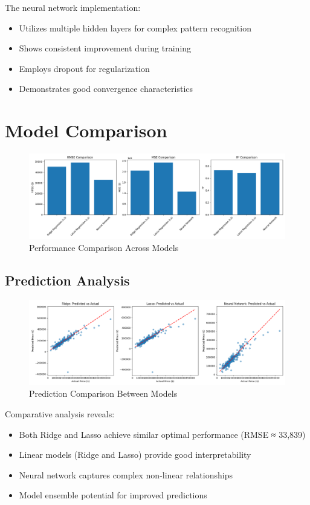 \documentclass[12pt]{report}
\begin{document}
The neural network implementation:
\begin{itemize}
    \item Utilizes multiple hidden layers for complex pattern recognition
    \item Shows consistent improvement during training
    \item Employs dropout for regularization
    \item Demonstrates good convergence characteristics
\end{itemize}

\section{Model Comparison}
\begin{figure}[H]
    \centering
    \includegraphics[width=1.0\textwidth]{figures/model_comparison.png}
    \caption{Performance Comparison Across Models}
    \label{fig:model_comparison}
\end{figure}

\subsection{Prediction Analysis}
\begin{figure}[H]
    \centering
    \includegraphics[width=1.0\textwidth]{figures/prediction_comparison.png}
    \caption{Prediction Comparison Between Models}
    \label{fig:prediction_comparison}
\end{figure}

Comparative analysis reveals:
\begin{itemize}
    \item Both Ridge and Lasso achieve similar optimal performance (RMSE ≈ 33,839)
    \item Linear models (Ridge and Lasso) provide good interpretability
    \item Neural network captures complex non-linear relationships
    \item Model ensemble potential for improved predictions
\end{itemize}
\end{document}
